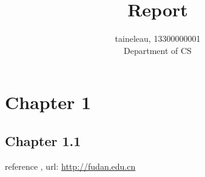 \documentclass[11pt, oneside]{article}
\begin{document}
\title{Report}
\author{taineleau, 13300000001 \\ Department of CS}
\maketitle
\section{Chapter 1}
\subsection{Chapter 1.1}


reference \cite{bishop2006pattern}, url: \url{http://fudan.edu.cn}



\end{document}
